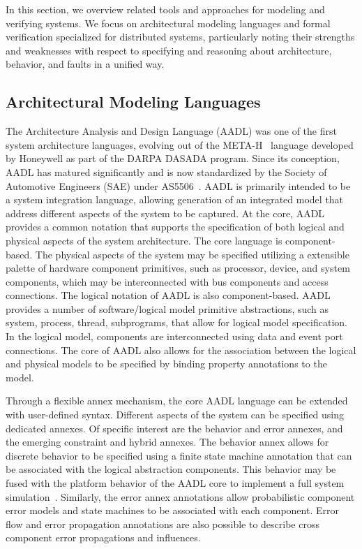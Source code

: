 
In this section, we overview related tools and approaches for modeling and verifying systems. We focus on architectural modeling languages and formal verification specialized for distributed systems, particularly noting their strengths and weaknesses with respect to specifying and reasoning about architecture, behavior, and faults in a unified way.

\subsection{Architectural Modeling Languages}\label{ssec:modeling}
The Architecture Analysis and Design Language (AADL) was one of the first system architecture languages, evolving out of the META-H~\cite{binns2001formalizing} language developed by Honeywell as part of the DARPA DASADA program. Since its conception, AADL has matured significantly and is now standardized by the Society  of Automotive Engineers (SAE) under AS5506~\cite{as5506}. AADL is primarily intended to be a system integration language, allowing generation  of an integrated  model that address  different aspects of the system to be captured.  At the core,  AADL provides a common notation that supports the   specification of  both  logical and physical aspects  of the system architecture. The core language is component-based. The physical aspects of the system may be specified utilizing a extensible palette of hardware component primitives, such as processor, device,  and system components, which may be interconnected with bus components and access connections. 
 The logical notation of AADL is  also component-based.  AADL provides a number of software/logical model primitive abstractions, such as system, process, thread, subprograms, that allow for logical model specification. In the logical model, components are interconnected using data and event port connections. The core of AADL also allows for the association between the logical and physical models to be specified by binding property annotations to the model.

Through a flexible annex mechanism, the  core  AADL language can be extended
with user-defined syntax. Different aspects of the system can be specified using
dedicated annexes.  Of specific interest are the behavior
and error annexes, and the emerging constraint and hybrid annexes.  The behavior
annex allows for discrete behavior to be specified  using a finite state machine
annotation that can be associated with the logical abstraction components. This
behavior may be fused with the platform behavior of the AADL core to implement a
full system simulation~\cite{dissaux2014smart}.  Similarly, the error annex
annotations allow probabilistic component  error models and state machines to be
associated with each component.  Error flow and error propagation  annotations
are also possible  to describe cross component error propagations and
influences.

